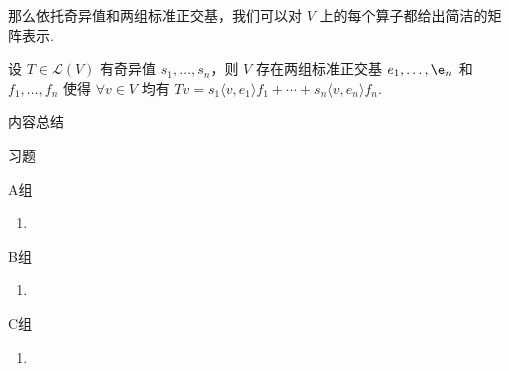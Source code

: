 那么依托奇异值和两组标准正交基，我们可以对 $ V $ 上的每个算子都给出简洁的矩阵表示.

\begin{theorem}
    设 $ T \in \mathcal{L}(V) $ 有奇异值 $ s_1, \ldots , s_n $，则 $ V $ 存在两组标准正交基
    $ e_1, \ldots, \e_n $ 和 $ f_1, \ldots, f_n $ 使得 $ \forall v \in V $ 均有
    $ Tv = s_1 \langle v, e_1 \rangle f_1 + \cdots + s_n \langle v, e_n \rangle f_n $.
\end{theorem}


\vspace{2ex}
\centerline{\heiti \Large 内容总结}

\vspace{2ex}

\centerline{\heiti \Large 习题}
\vspace{2ex}
{\kaishu }
\begin{flushright}
    \kaishu

\end{flushright}
\centerline{\heiti A组}
\begin{enumerate}
    \item
\end{enumerate}
\centerline{\heiti B组}
\begin{enumerate}
    \item
\end{enumerate}
\centerline{\heiti C组}
\begin{enumerate}
    \item
\end{enumerate}
